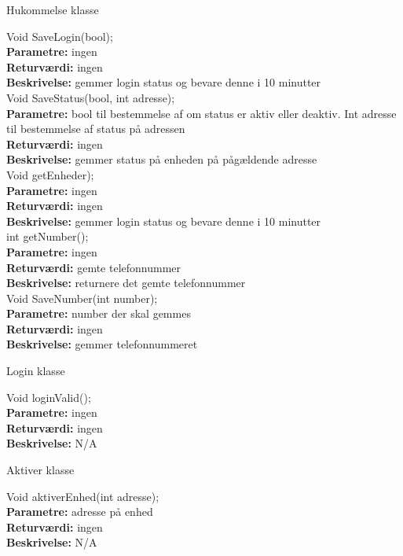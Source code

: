 {\centering
Hukommelse klasse\par
}

Void SaveLogin(bool); \\
\textbf{Parametre:} ingen \\
\textbf{Returværdi:} ingen \\
\textbf{Beskrivelse:} gemmer login status og bevare denne i 10 minutter \\

Void SaveStatus(bool, int adresse); \\
\textbf{Parametre:} bool til bestemmelse af om status er aktiv eller deaktiv. Int adresse til bestemmelse af status på adressen \\
\textbf{Returværdi:} ingen \\
\textbf{Beskrivelse:} gemmer status på enheden på pågældende adresse \\

Void getEnheder); \\
\textbf{Parametre:} ingen \\
\textbf{Returværdi:} ingen \\
\textbf{Beskrivelse:} gemmer login status og bevare denne i 10 minutter \\

int getNumber(); \\
\textbf{Parametre:} ingen \\
\textbf{Returværdi:} gemte telefonnummer \\
\textbf{Beskrivelse:} returnere det gemte telefonnummer \\

Void SaveNumber(int number); \\
\textbf{Parametre:} number der skal gemmes \\
\textbf{Returværdi:} ingen \\
\textbf{Beskrivelse:} gemmer telefonnummeret \\

{\centering 
Login klasse\par
}

Void loginValid(); \\
\textbf{Parametre:} ingen  \\
\textbf{Returværdi:} ingen \\
\textbf{Beskrivelse:} N/A \\

{\centering 
Aktiver klasse\par
}

Void aktiverEnhed(int adresse); \\
\textbf{Parametre:} adresse på enhed \\
\textbf{Returværdi:} ingen \\
\textbf{Beskrivelse:} N/A \\

